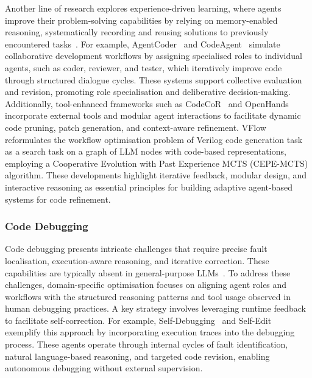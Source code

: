 \documentclass[]{selfevolagent}
\theoremstyle{plain}
\theoremstyle{definition}
\theoremstyle{remark}
\begin{document}
Another line of research explores experience-driven learning, where agents improve their problem-solving capabilities by relying on memory-enabled reasoning, systematically recording and reusing solutions to previously encountered tasks~\citep{wang2024openhands,tang2024codeagent,pan2025codecor}. For example, AgentCoder~\citep{huang2023agentcoder} and CodeAgent~\citep{tang2024codeagent} simulate collaborative development workflows by assigning specialised roles to individual agents, such as coder, reviewer, and tester, which iteratively improve code through structured dialogue cycles. These systems support collective evaluation and revision, promoting role specialisation and deliberative decision-making. Additionally, tool-enhanced frameworks such as CodeCoR~\citep{pan2025codecor} and OpenHands~\citep{wang2024openhands} incorporate external tools and modular agent interactions to facilitate dynamic code pruning, patch generation, and context-aware refinement. VFlow~\citep{wei2025vflow} reformulates the workflow optimisation problem of Verilog code generation task as a search task on a graph of LLM nodes with code-based representations, employing a Cooperative Evolution with Past Experience MCTS (CEPE-MCTS) algorithm. These developments highlight iterative feedback, modular design, and interactive reasoning as essential principles for building adaptive agent-based systems for code refinement.




\subsubsection{Code Debugging}

Code debugging presents intricate challenges that require precise fault localisation, execution-aware reasoning, and iterative correction. These capabilities are typically absent in general-purpose LLMs~\citep{puvvadi2025coding, mannadiar2010debugging}. To address these challenges, domain-specific optimisation focuses on aligning agent roles and workflows with the structured reasoning patterns and tool usage observed in human debugging practices. A key strategy involves leveraging runtime feedback to facilitate self-correction. For example, Self-Debugging~\citep{chen2023teaching} and Self-Edit~\citep{zhang2023self} exemplify this approach by incorporating execution traces into the debugging process. These agents operate through internal cycles of fault identification, natural language-based reasoning, and targeted code revision, enabling autonomous debugging without external supervision.
\end{document}

